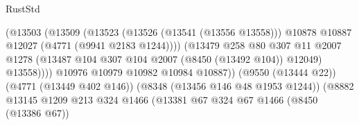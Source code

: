 \begin{lexlean}{RustStd}
\begin{coremodule}
                                                    (@13503
                                                      (@13509
                                                        (@13523
                                                          (@13526 (@13541 (@13556 @13558)))
                                                          @10878
                                                          @10887
                                                          @12027
                                                          (@4771 (@9941 @2183 @1244))))
                                                      (@13479
                                                        @258
                                                        @80
                                                        @307
                                                        @11
                                                        @2007
                                                        @1278
                                                        (@13487
                                                          @104
                                                          @307
                                                          @104
                                                          @2007
                                                          (@8450 (@13492 @104))
                                                          @12049)
                                                        @13558))))
                                                @10976
                                                @10979
                                                @10982
                                                @10984
                                                @10887))
                                            (@9550 (@13444 @22))
                                            (@4771 (@13449 @402 @146))
                                            (@8348 (@13456 @146 @48 @1953 @1244))
                                            (@8882
                                              @13145
                                              @1209
                                              @213
                                              @324
                                              @1466
                                              (@13381
                                                @67
                                                @324
                                                @67
                                                @1466
                                                (@8450 (@13386 @67))

\end{coremodule}
\end{lexlean}
